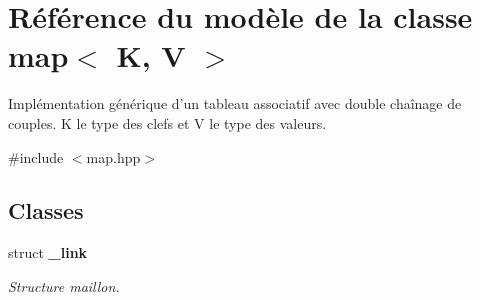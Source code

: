 \hypertarget{classmap}{\section{Référence du modèle de la classe map$<$ K, V $>$}
\label{classmap}
}


Implémentation générique d'un tableau associatif avec double chaînage de couples. K le type des clefs et V le type des valeurs.  




{\ttfamily \#include $<$map.\-hpp$>$}

\subsection*{Classes}
\begin{DoxyCompactItemize}
\item 
struct {\bfseries \-\_\-link}
\begin{DoxyCompactList}\small\item\em Structure maillon. \end{DoxyCompactList}\end{DoxyCompactItemize}

